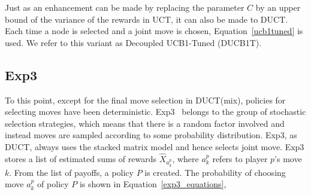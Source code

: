 \documentclass{article}
\begin{document}


Just as an enhancement can be made by replacing the parameter $C$ by an upper bound of the variance of the rewards in UCT, it can also be made to DUCT. Each time a node is selected and a joint move is chosen, Equation~\ref{ucb1tuned} is used. We refer to this variant as Decoupled UCB1-Tuned (DUCB1T).

\subsection{Exp3}
\label{subsec:exp3}

To this point, except for the final move selection in DUCT(mix), policies for selecting moves have been deterministic. Exp3~\cite{Exp3} belongs to the group of stochastic selection strategies, which means that there is a random factor involved and instead moves are sampled according to some probability distribution. %
Exp3, as DUCT, always uses the stacked matrix model and hence selects joint move.
Exp3 stores a list of estimated sums of rewards $\hat{X}_{a^{p}_{k}}$, where $a^{p}_{k}$ refers to player $p$'s move $k$. From the list of payoffs, a policy $P$ is created. The probability of choosing move $a^{p}_{k}$ of policy $P$ is shown in Equation~\ref{exp3_equations}, 
\end{document}
